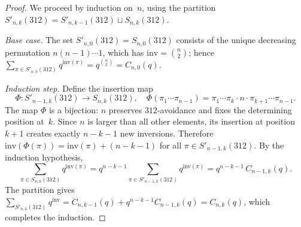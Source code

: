 \documentclass[10pt,a4paper]{amsart}
\newcommand{\Inv}{\mathrm{inv}}
\newcommand{\Snk}[1]{S_{n,k}(#1)}
\newcommand{\Snkp}[1]{S'_{n,k}(#1)}
\begin{document}
\begin{proof}
We proceed by induction on~$n$, using the partition
$\Snkp{312}=S'_{n,k-1}(312)\sqcup\Snk{312}$.

\textit{Base case.}
The set $S'_{n,0}(312)=S_{n,0}(312)$ consists of the unique
decreasing permutation $n(n{-}1)\cdots1$, which has $\Inv=\binom{n}{2}$;
hence $\sum_{\pi\in S'_{n,0}(312)}q^{\Inv(\pi)}=q^{\binom{n}{2}}=C_{n,0}(q)$.

\textit{Induction step.}
Define the insertion map
\[\Phi : S'_{n-1,k}(312)\to\Snk{312},\quad
\Phi(\pi_1\cdots\pi_{n-1})=\pi_1\cdots\pi_k\cdot n\cdot\pi_{k+1}\cdots\pi_{n-1}.\]
The map $\Phi$ is a bijection: $n$ preserves $312$-avoidance and fixes
the determining position at~$k$.
Since $n$ is larger than all other elements, its insertion at position $k+1$
creates exactly $n-k-1$ new inversions.
Therefore $\Inv(\Phi(\pi))=\Inv(\pi)+(n-k-1)$ for all $\pi\in S'_{n-1,k}(312)$.
By the induction hypothesis,
\[\sum_{\pi\in\Snk{312}} q^{\Inv(\pi)}
=q^{n-k-1}\sum_{\pi\in S'_{n-1,k}(312)} q^{\Inv(\pi)}
=q^{n-k-1}\,C_{n-1,k}(q).\]
The partition gives
$\sum_{\Snkp{312}}q^{\Inv}=C_{n,k-1}(q)+q^{n-k-1}C_{n-1,k}(q)=C_{n,k}(q)$,
which completes the induction.
\end{proof}
\end{document}

